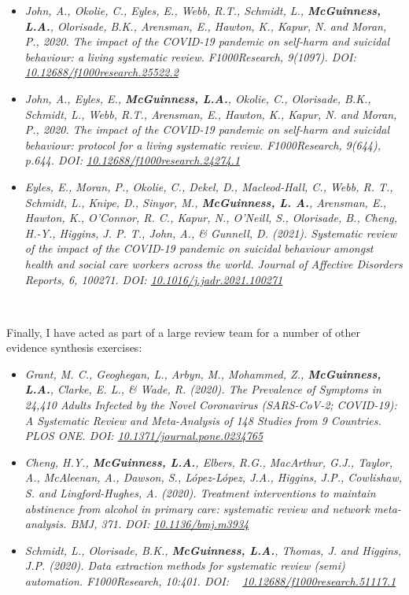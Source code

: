 \documentclass[a4paper, twoside]{templates/ociamthesis}
\begin{document}
\begin{itemize}
\item
  \emph{John, A., Okolie, C., Eyles, E., Webb, R.T., Schmidt, L., \textbf{McGuinness, L.A.}, Olorisade, B.K., Arensman, E., Hawton, K., Kapur, N. and Moran, P., 2020. The impact of the COVID-19 pandemic on self-harm and suicidal behaviour: a living systematic review. F1000Research, 9(1097). DOI: ~ \href{https://doi.org/10.12688/f1000research.25522.2}{10.12688/f1000research.25522.2}}
\item
  \emph{John, A., Eyles, E., \textbf{McGuinness, L.A.}, Okolie, C., Olorisade, B.K., Schmidt, L., Webb, R.T., Arensman, E., Hawton, K., Kapur, N. and Moran, P., 2020. The impact of the COVID-19 pandemic on self-harm and suicidal behaviour: protocol for a living systematic review. F1000Research, 9(644), p.644. DOI: \href{https://doi.org/10.12688/f1000research.24274.1}{10.12688/f1000research.24274.1}}
\item
  \emph{Eyles, E., Moran, P., Okolie, C., Dekel, D., Macleod-Hall, C., Webb, R. T., Schmidt, L., Knipe, D., Sinyor, M., \textbf{McGuinness, L. A.}, Arensman, E., Hawton, K., O'Connor, R. C., Kapur, N., O'Neill, S., Olorisade, B., Cheng, H.-Y., Higgins, J. P. T., John, A., \& Gunnell, D. (2021). Systematic review of the impact of the COVID-19 pandemic on suicidal behaviour amongst health and social care workers across the world. Journal of Affective Disorders Reports, 6, 100271. DOI: \href{https://doi.org/10.1016/j.jadr.2021.100271}{10.1016/j.jadr.2021.100271}}
\end{itemize}

~

Finally, I have acted as part of a large review team for a number of other evidence synthesis exercises:

\begin{itemize}
\item
  \emph{Grant, M. C., Geoghegan, L., Arbyn, M., Mohammed, Z., \textbf{McGuinness, L.A.}, Clarke, E. L., \& Wade, R. (2020). The Prevalence of Symptoms in 24,410 Adults Infected by the Novel Coronavirus (SARS-CoV-2; COVID-19): A Systematic Review and Meta-Analysis of 148 Studies from 9 Countries. PLOS ONE. DOI: \href{https://doi.org/10.1371/journal.pone.0234765}{10.1371/journal.pone.0234765}}
\item
  \emph{Cheng, H.Y., \textbf{McGuinness, L.A.}, Elbers, R.G., MacArthur, G.J., Taylor, A., McAleenan, A., Dawson, S., López-López, J.A., Higgins, J.P., Cowlishaw, S. and Lingford-Hughes, A. (2020). Treatment interventions to maintain abstinence from alcohol in primary care: systematic review and network meta-analysis. BMJ, 371. DOI: \href{https://doi.org/10.1136/bmj.m3934}{10.1136/bmj.m3934}}
\item
  \emph{Schmidt, L., Olorisade, B.K., \textbf{McGuinness, L.A.}, Thomas, J. and Higgins, J.P. (2020). Data extraction methods for systematic review (semi) automation. F1000Research, 10:401. DOI: ~ \href{https://doi.org/10.12688/f1000research.51117.1}{10.12688/f1000research.51117.1}}
\end{itemize}
\end{document}
